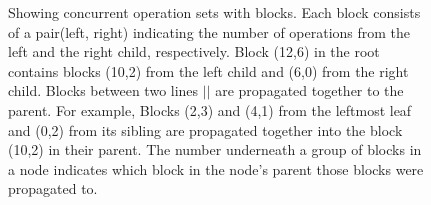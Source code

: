 \documentclass[10pt]{article}
\theoremstyle{definition}
\begin{document}
\begin{figure}

\begin{center}
\end{center}
\caption{\label{fig:block} Showing concurrent operation sets with blocks. Each block consists of a pair(left, right) indicating the number of operations from the left and the right child, respectively. Block (12,6) in the root contains blocks (10,2) from the left child and (6,0) from the right child. Blocks between two lines $||$ are propagated together to the parent. For example, Blocks (2,3) and (4,1) from the leftmost leaf and (0,2) from its sibling are propagated together into the block (10,2) in their parent. The number underneath a group of blocks in a node indicates which block in the node's parent those blocks were propagated to.}
\end{figure}
\end{document}

